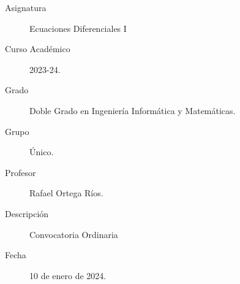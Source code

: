 \documentclass[12pt]{article}
\begin{document}

    
    

    \begin{description}
        \item[Asignatura] Ecuaciones Diferenciales I
        \item[Curso Académico] 2023-24.
        \item[Grado] Doble Grado en Ingeniería Informática y Matemáticas.
        \item[Grupo] Único.
        \item[Profesor] Rafael Ortega Ríos.
        \item[Descripción] Convocatoria Ordinaria
        \item[Fecha] 10 de enero de 2024.
    
    \end{description}
    \newpage
\end{document}
